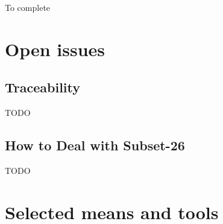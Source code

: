   To complete


%

\section{Open issues}

\subsection{Traceability}

TODO

\subsection{How to Deal with Subset-26}

TODO

%
%

\section{Selected means and tools}

\begin{comment}
To complete after decision meeting with a section for each tool with the following contents:

\begin{itemize}
\item description of the means or tools, references and links
\item added value for openETCS
\item for which tasks and how (input/output/actions) is the mean or tools used.
\end{itemize}
\end{comment}